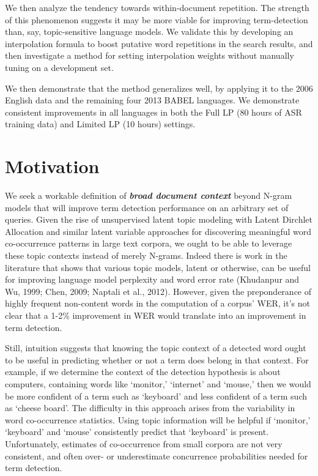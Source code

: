 \documentclass[11pt]{article}
\begin{document}
We then analyze the tendency towards within-document repetition. The strength of this phenomenon suggests it may be more viable for improving term-detection than, say, topic-sensitive language models.  We validate this by developing an interpolation formula to boost putative word repetitions in the search results, and then investigate a method for setting interpolation weights without manually tuning on a development set.  

We then demonstrate that the method generalizes well, by applying it to the 2006 English data and the remaining four 2013 {\small BABEL} languages.  We demonstrate consistent improvements in all languages in both the Full LP (80 hours of ASR training data) and Limited LP (10 hours) settings.

\section{Motivation}
We seek a workable definition of \textit{\textbf{broad document context}} beyond N-gram models that will improve term detection performance on an arbitrary set of queries.  Given the rise of unsupervised latent topic modeling with Latent Dirchlet Allocation \cite{blei2003latent} and similar latent variable approaches for discovering meaningful word co-occurrence patterns in large text corpora, we ought to be able to leverage these topic contexts instead of merely N-grams.   Indeed there is work in the literature that shows that various topic models, latent or otherwise, can be useful for improving language model perplexity and word error rate (Khudanpur and Wu, 1999; Chen, 2009; Naptali et al., 2012). However, given the preponderance of highly frequent non-content words in the computation of a corpus' WER, it's not clear that a 1-2\% improvement in WER would translate into an improvement in term detection.   

\nocite{khudanpur1999, chen2009, naptali2012}

Still, intuition suggests that knowing the topic context of a detected word ought to be useful in predicting whether or not a term does belong in that context.  For example, if we determine the context of the detection hypothesis is about computers, containing words like `monitor,' `internet' and `mouse,' then we would be more confident of a term such as `keyboard' and less confident of a term such as `cheese board'.  The difficulty in this approach arises from the variability in word co-occurrence statistics.  Using topic information will be helpful if `monitor,' `keyboard' and `mouse' consistently predict that `keyboard' is present.  Unfortunately, estimates of co-occurrence from small corpora are not very consistent, and often over- or underestimate concurrence probabilities needed for term detection.  
\end{document}
